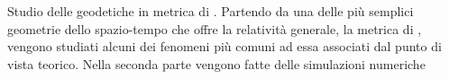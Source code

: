 Studio delle geodetiche in metrica di \Sh{}.
Partendo da una delle più semplici geometrie dello spazio-tempo che offre la relatività generale, la metrica di \Sh{}, vengono studiati alcuni dei fenomeni più comuni ad essa associati dal punto di vista teorico.
Nella seconda parte vengono fatte delle simulazioni numeriche
